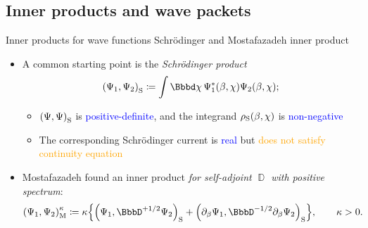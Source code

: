 \documentclass[8pt]{beamer}
\begin{document}
\subsection{Inner products and wave packets}

\begin{frame}%
{Inner products for wave functions}%
{Schrödinger and Mostafazadeh inner product}

\begin{itemize}


\item A common starting point is the
\emph{Schrödinger product}
\begin{align}
\rbr{\Psi_1,\Psi_2}_\text{S} \coloneqq
\int \dd \chi\,\rfun{\Psi_1^*}{\beta,\chi} \rfun{\Psi_2}{\beta,\chi};
\end{align}

\begin{itemize}
\item ${\left(\Psi, \Psi\right)}_\text{S}$ is \textcolor{blue}{positive-definite},
and the integrand ${\rho_\text{S}}\mathopen{}\left(\beta,\chi\right)\mathclose{}$ is
\textcolor{blue}{non-negative}

\item The corresponding Schrödinger current is \textcolor{blue}{real} but
\textcolor{orange}{does not satisfy continuity equation}
\end{itemize}

\item Mostafazadeh found
an inner product \emph{for self-adjoint $\BbbD$ with positive spectrum}:
\begin{align}
\rbr{\Psi_1,\Psi_2}_\text{M}^{\kappa} &\coloneqq\kappa\cbr{
\rbr{\Psi_1,\BbbD^{+1/2}\Psi_2}_\text{S}
+\rbr{\partial_\beta\Psi_1,
\BbbD^{-1/2}\partial_\beta\Psi_2}_\text{S}}, \qquad \kappa > 0.
\end{align}


\end{itemize}
\end{frame}
\end{document}
